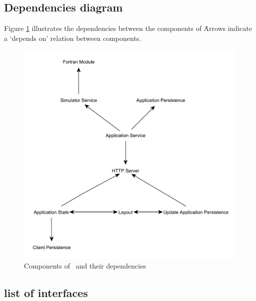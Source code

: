 \subsection{Dependencies diagram}
\label{subsec:depdiag}
Figure \ref{fig:compdependencies} illustrates the dependencies between the components of \projectname\. Arrows indicate a `depends on' relation between components.

\noindent
\begin{figure}
	\centering
	\includegraphics[width=\textwidth]{ComponentDependencies}
	\caption{Components of \projectname\ and their dependencies}
	\label{fig:compdependencies}
\end{figure}

\subsection{list of interfaces}
\label{subsec:compinterfaces}




